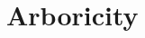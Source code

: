 \documentclass[12pt,reqno]{amsart}
\numberwithin{definition}{section}
\theoremstyle{definition}
\begin{document}












\section{Arboricity}
\label{arboricty}

\end{document}
